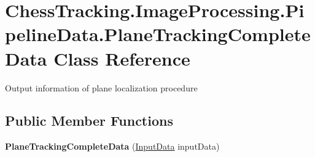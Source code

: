 \hypertarget{class_chess_tracking_1_1_image_processing_1_1_pipeline_data_1_1_plane_tracking_complete_data}{}\section{Chess\+Tracking.\+Image\+Processing.\+Pipeline\+Data.\+Plane\+Tracking\+Complete\+Data Class Reference}
\label{class_chess_tracking_1_1_image_processing_1_1_pipeline_data_1_1_plane_tracking_complete_data}


Output information of plane localization procedure  


\subsection*{Public Member Functions}
\begin{DoxyCompactItemize}
\item 
\mbox{\label{class_chess_tracking_1_1_image_processing_1_1_pipeline_data_1_1_plane_tracking_complete_data_aca870286489c49f68633fa0b47e3d85b}} 
{\bfseries Plane\+Tracking\+Complete\+Data} (\mbox{\hyperlink{class_chess_tracking_1_1_image_processing_1_1_pipeline_data_1_1_input_data}{Input\+Data}} input\+Data)
\end{DoxyCompactItemize}

